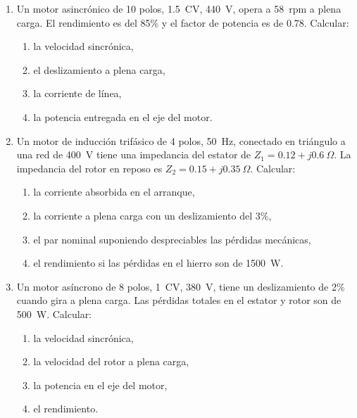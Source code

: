 \documentclass[../main]{subfiles}
\begin{document}
\begin{enumerate}
    \begin{enumerate}
      \item el deslizamiento,
      \item las pérdidas en el rotor,
      \item la potencia útil en el eje del motor,
      \item el rendimiento.
    \end{enumerate}
  \item Un motor asincrónico de 10 polos, \qty{1.5}{CV}, \qty{440}{V}, opera a \qty{58}{rpm} a plena carga. El rendimiento es del 85\% y el factor de potencia es de 0.78. Calcular:
    \begin{enumerate}
      \item la velocidad sincrónica,
      \item el deslizamiento a plena carga,
      \item la corriente de línea,
      \item la potencia entregada en el eje del motor.
    \end{enumerate}
  \item Un motor de inducción trifásico de 4 polos, \qty{50}{Hz}, conectado en triángulo a una red de \qty{400}{V} tiene una impedancia del estator de $Z_1 = 0.12 + j0.6~\Omega$. La impedancia del rotor en reposo es $Z_2 = 0.15 + j0.35~\Omega$. Calcular:
    \begin{enumerate}
      \item la corriente absorbida en el arranque,
      \item la corriente a plena carga con un deslizamiento del 3\%,
      \item el par nominal suponiendo despreciables las pérdidas mecánicas,
      \item el rendimiento si las pérdidas en el hierro son de \qty{1500}{W}.
    \end{enumerate}
  \item Un motor asíncrono de 8 polos, \qty{1}{CV}, \qty{380}{V}, tiene un deslizamiento de 2\% cuando gira a plena carga. Las pérdidas totales en el estator y rotor son de \qty{500}{W}. Calcular:
    \begin{enumerate}
      \item la velocidad sincrónica,
      \item la velocidad del rotor a plena carga,
      \item la potencia en el eje del motor,
      \item el rendimiento.
    \end{enumerate}

\end{enumerate}
\end{document}
